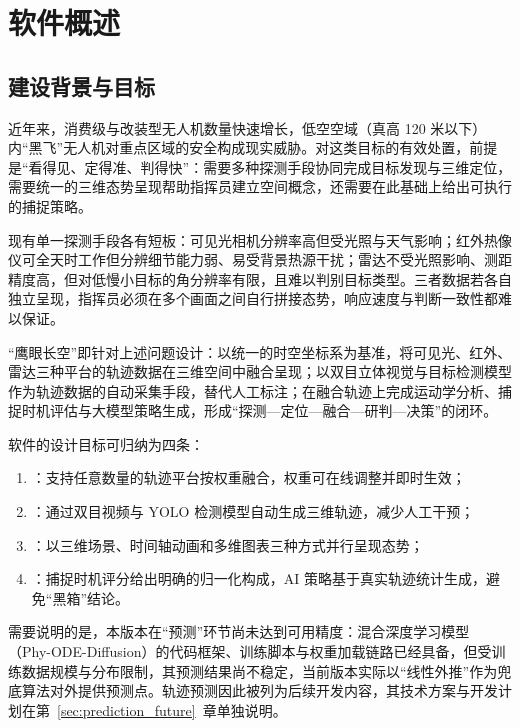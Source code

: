 \section{软件概述}

\subsection{建设背景与目标}

近年来，消费级与改装型无人机数量快速增长，低空空域（真高 120 米以下）内“黑飞”无人机对重点区域的安全构成现实威胁。对这类目标的有效处置，前提是“看得见、定得准、判得快”：需要多种探测手段协同完成目标发现与三维定位，需要统一的三维态势呈现帮助指挥员建立空间概念，还需要在此基础上给出可执行的捕捉策略。

现有单一探测手段各有短板：可见光相机分辨率高但受光照与天气影响；红外热像仪可全天时工作但分辨细节能力弱、易受背景热源干扰；雷达不受光照影响、测距精度高，但对低慢小目标的角分辨率有限，且难以判别目标类型。三者数据若各自独立呈现，指挥员必须在多个画面之间自行拼接态势，响应速度与判断一致性都难以保证。

“鹰眼长空”即针对上述问题设计：以统一的时空坐标系为基准，将可见光、红外、雷达三种平台的轨迹数据在三维空间中融合呈现；以双目立体视觉与目标检测模型作为轨迹数据的自动采集手段，替代人工标注；在融合轨迹上完成运动学分析、捕捉时机评估与大模型策略生成，形成“探测—定位—融合—研判—决策”的闭环。

软件的设计目标可归纳为四条：
\begin{enumerate}
  \item {}：支持任意数量的轨迹平台按权重融合，权重可在线调整并即时生效；
  \item {}：通过双目视频与 YOLO 检测模型自动生成三维轨迹，减少人工干预；
  \item {}：以三维场景、时间轴动画和多维图表三种方式并行呈现态势；
  \item {}：捕捉时机评分给出明确的归一化构成，AI 策略基于真实轨迹统计生成，避免“黑箱”结论。
\end{enumerate}

需要说明的是，本版本在“预测”环节尚未达到可用精度：混合深度学习模型（Phy-ODE-Diffusion）的代码框架、训练脚本与权重加载链路已经具备，但受训练数据规模与分布限制，其预测结果尚不稳定，当前版本实际以“线性外推”作为兜底算法对外提供预测点。轨迹预测因此被列为后续开发内容，其技术方案与开发计划在第~\ref{sec:prediction_future}~章单独说明。

